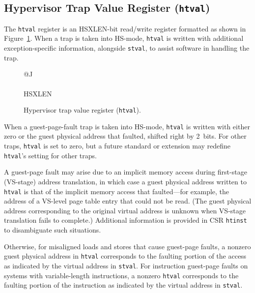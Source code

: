 \subsection{Hypervisor Trap Value Register ({\tt htval})}

The {\tt htval} register is an HSXLEN-bit read/write register formatted
as shown in Figure~\ref{htvalreg}.
When a trap is taken into HS-mode, {\tt htval} is written with additional
exception-specific information, alongside {\tt stval}, to assist software
in handling the trap.

\begin{figure}[h!]
{\footnotesize
\begin{center}
\begin{tabular}{@{}J}
 \\
\hline
{} \\
\hline
HSXLEN \\
\end{tabular}
\end{center}
}
\vspace{-0.1in}
\caption{Hypervisor trap value register ({\tt htval}).}
\label{htvalreg}
\end{figure}

When a guest-page-fault trap is taken into HS-mode, {\tt htval} is
written with either zero or the guest physical address that faulted,
shifted right by 2~bits.
For other traps, {\tt htval} is set to zero, but a future standard or
extension may redefine {\tt htval}'s setting for other traps.

A guest-page fault may arise due to an implicit memory access during
first-stage (VS-stage) address translation, in which case a guest
physical address written to {\tt htval} is that of the implicit memory
access that faulted---for example, the address of a VS-level page table
entry that could not be read.
(The guest physical address corresponding to the original virtual address
is unknown when VS-stage translation fails to complete.)
Additional information is provided in CSR {\tt htinst} to disambiguate
such situations.

Otherwise, for misaligned loads and stores that cause guest-page faults,
a nonzero guest physical address in {\tt htval} corresponds to the
faulting portion of the access as indicated by the virtual address in
{\tt stval}.
For instruction guest-page faults on systems with variable-length
instructions, a nonzero {\tt htval} corresponds to the faulting portion
of the instruction as indicated by the virtual address in {\tt stval}.

